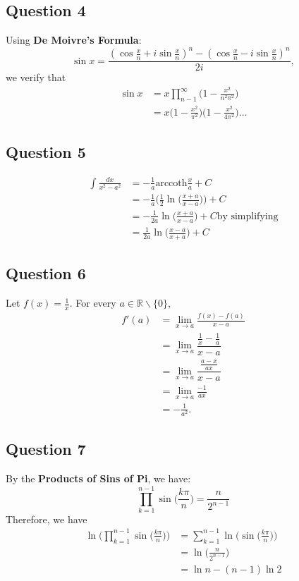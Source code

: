 \documentclass[12pt]{article}
\begin{document}
\subsection{Question 4}
Using \textbf{De Moivre's Formula}: $$\sin x=\dfrac{(\cos\frac{x}{n}+i\sin\frac{x}{n})^n-(\cos\frac{x}{n}-i\sin\frac{x}{n})^n}{2i},$$ we verify that \begin{align*}
    \sin x&=x\prod_{n-1}^\infty\bigg(1-\frac{x^2}{n^2\pi^2}\bigg)\\
    &=x\bigg(1-\frac{x^2}{\pi^2}\bigg)\bigg(1-\frac{x^2}{4\pi^2}\bigg)\dots
\end{align*}
\subsection{Question 5}
\begin{align*}
    \int\frac{dx}{x^2-a^2} &= -\frac{1}{a}\text{arccoth}\frac{x}{a}+C\\
    &= -\frac{1}{a}\bigg(\frac{1}{2}\ln\bigg(\frac{x+a}{x-a}\bigg)\bigg)+C\\
    &= -\frac{1}{2a}\ln\bigg(\frac{x+a}{x-a}\bigg)+C\text{by simplifying}\\
    &= \frac{1}{2a}\ln\bigg(\frac{x-a}{x+a}\bigg)+C
\end{align*}
\subsection{Question 6}
Let $f(x)=\frac{1}{x}$. For every $a\in\mathbb{R}\backslash \{0\}$,
\begin{align*}
    f'(a) &= \lim_{x\to a}\frac{f(x)-f(a)}{x-a}\\
    &= \lim_{x\to a}\dfrac{\frac{1}{x}-\frac{1}{a}}{x-a}\\
    &= \lim_{x\to a}\dfrac{\frac{a-x}{ax}}{x-a}\\
    &= \lim_{x\to a}\frac{-1}{ax}\\
    &= -\frac{1}{a^2}.
\end{align*}
\subsection{Question 7}
By the \textbf{Products of Sins of Pi}, we have: $$\prod_{k=1}^{n-1}\sin\bigg(\frac{k\pi}{n}\bigg)=\frac{n}{2^{n-1}}$$ Therefore, we have \begin{align*}
    \ln\Bigg(\prod_{k=1}^{n-1}\sin\bigg(\frac{k\pi}{n}\bigg)\Bigg) 
    &= \sum_{k=1}^{n-1}\ln\Bigg(\sin\bigg(\frac{k\pi}{n}\bigg)\Bigg)\\
    &= \ln\bigg(\frac{n}{2^{n-1}}\bigg)\\
    &= \ln n-(n-1)\ln 2
\end{align*}
\end{document}
